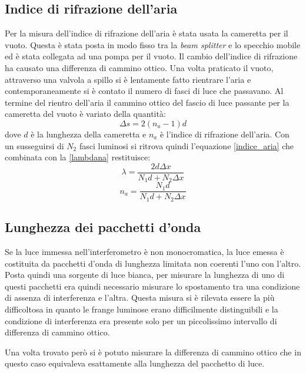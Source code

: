 \documentclass[a4paper,11pt]{article}
\begin{document}
	\subsection{Indice di rifrazione dell'aria}
	Per la misura dell'indice di rifrazione dell'aria è stata usata la cameretta per il vuoto. Questa è stata posta in modo fisso tra la \emph{beam splitter} e lo specchio mobile ed è stata collegata ad una pompa per il vuoto. Il cambio dell'indice di rifrazione ha causato una differenza di cammino ottico. Una volta praticato il vuoto, attraverso una valvola a spillo si è lentamente fatto rientrare l'aria e contemporaneamente si è contato il numero di fasci di luce che passavano. Al termine del rientro dell'aria il cammino ottico del fascio di luce passante per la cameretta del vuoto è variato della quantità:
	\begin{equation}\label{deltavuoto}
		\Delta s = 2(n_a-1)d
	\end{equation}
	dove $ d $ è la lunghezza della cameretta e $ n_a $ è l'indice di rifrazione dell'aria. Con un susseguirsi di $ N_2 $ fasci luminosi si ritrova quindi l'equazione \ref{indice_aria} che combinata con la \ref{lambdana} restituisce:
	\begin{equation}\label{lambda}
		\lambda=\dfrac{2d\Delta x}{N_1 d + N_2 \Delta x}
	\end{equation}
	\begin{equation}\label{na}
		n_a=\dfrac{N_1 d}{N_1 d + N_2 \Delta x}
	\end{equation}
	
	\subsection{Lunghezza dei pacchetti d'onda}
	Se la luce immessa nell'interferometro è non monocromatica, la luce emessa è costituita da pacchetti d'onda di lunghezza limitata non coerenti l'uno con l'altro. Posta quindi una sorgente di luce bianca, per misurare la lunghezza di uno di questi pacchetti era quindi necessario misurare lo spostamento tra una condizione di assenza di interferenza e l'altra. Questa misura si è rilevata essere la più difficoltosa in quanto le frange luminose erano difficilmente distinguibili e la condizione di interferenza era presente solo per un piccolissimo intervallo di differenza di cammino ottico.
	
	Una volta trovato però si è potuto misurare la differenza di cammino ottico che in questo caso equivaleva esattamente alla lunghezza del pacchetto di luce. 
	
\end{document}
